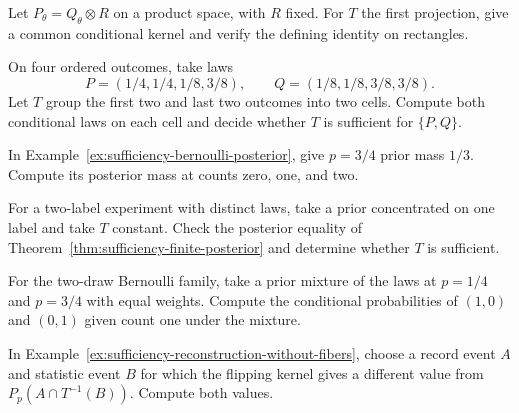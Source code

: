 \documentclass[11pt,oneside]{book}
\theoremstyle{definition}
\theoremstyle{remark}
\begin{document}
\begin{practiceexercise}
\label{pex:sufficiency-independent-extra-measurement}
Let $P_\theta=Q_\theta\otimes R$ on a product space, with $R$
fixed. For $T$ the first projection, give a common conditional
kernel and verify the defining identity on rectangles.
\end{practiceexercise}

\begin{practiceexercise}
\label{pex:sufficiency-test-two-fibers}
On four ordered outcomes, take laws
\[
P=(1/4,1/4,1/8,3/8),\qquad Q=(1/8,1/8,3/8,3/8).
\]
Let $T$ group the first two and last two outcomes into two cells.
Compute both conditional laws on each cell and decide whether
$T$ is sufficient for $\{P,Q\}$.
\end{practiceexercise}

\begin{practiceexercise}
\label{pex:sufficiency-bernoulli-unequal-prior}
In Example~\ref{ex:sufficiency-bernoulli-posterior}, give
$p=3/4$ prior mass $1/3$. Compute its posterior mass at
counts zero, one, and two.
\end{practiceexercise}

\begin{practiceexercise}
\label{pex:sufficiency-posterior-zero-prior}
For a two-label experiment with distinct laws, take a prior
concentrated on one label and take $T$ constant. Check the
posterior equality of Theorem~\ref{thm:sufficiency-finite-posterior}
and determine whether $T$ is sufficient.
\end{practiceexercise}

\begin{practiceexercise}
\label{pex:sufficiency-mixture-conditional-law}
For the two-draw Bernoulli family, take a prior mixture of the
laws at $p=1/4$ and $p=3/4$ with equal weights. Compute the
conditional probabilities of $(1,0)$ and $(0,1)$ given
count one under the mixture.
\end{practiceexercise}

\begin{practiceexercise}
\label{pex:sufficiency-flip-fiber-failure}
In Example~\ref{ex:sufficiency-reconstruction-without-fibers},
choose a record event $A$ and statistic event $B$ for which
the flipping kernel gives a different value from
$P_p(A\cap T^{-1}(B))$. Compute both values.
\end{practiceexercise}
\end{document}
